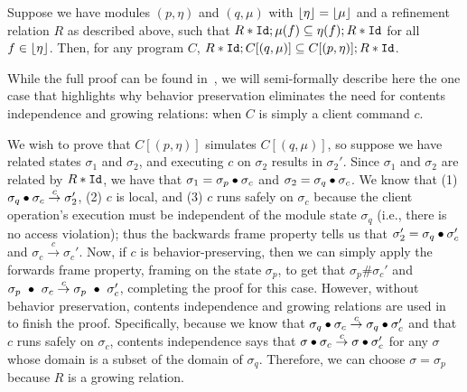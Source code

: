 \begin{thm}
Suppose we have modules $(p,\eta)$ and $(q,\mu)$ with $\lfloor \eta \rfloor = \lfloor \mu \rfloor$ and a refinement relation $R$ as described above, such that 
$R*\text{\tt{Id}};\mu(f) \subseteq \eta(f);R*\text{\tt{Id}}$ for all $f \in \lfloor \eta \rfloor$. Then, for any program $C$, $R*\text{\tt{Id}};C[(q,\mu)] \subseteq C[(p,\eta)];R*\text{\tt{Id}}$.
\end{thm}
\begin{comment}
\ifextended
See the campanion Coq file~\cite{costanzo12:bpsltr} for the full proof of this theorem.  
We will semi-formally describe here the one case 
that highlights why behavior preservation eliminates the need for contents independence and growing 
relations: when $C$ is simply a client command $c$.
\else
\end{comment}
While the full proof can be found in~\cite{costanzo12:bpsltr}, we will semi-formally describe here the one case 
that highlights why behavior preservation eliminates the need for contents independence and growing 
relations: when $C$ is simply a client command $c$. 

We wish to prove
that $C[(p,\eta)]$ simulates $C[(q,\mu)]$, so suppose we have related states $\sigma_1$ and $\sigma_2$, and 
executing $c$ on $\sigma_2$ results in $\sigma_2'$. Since $\sigma_1$ and $\sigma_2$ are related by $R*\text{\tt{Id}}$, we
have that $\sigma_1 = \sigma_p \bullet \sigma_c$ and $\sigma_2 = \sigma_q \bullet \sigma_c$. We know that
(1) $\sigma_q \bullet \sigma_c \stackrel{c}{\to} \sigma_2'$, (2) $c$ is local, and (3) $c$ runs safely on $\sigma_c$ because the
client operation's execution must be independent of the module state $\sigma_q$ (i.e., there
is no access violation); thus the backwards frame property tells us that
$\sigma_2' = \sigma_q \bullet \sigma_c'$ and $\sigma_c \stackrel{c}{\to} \sigma_c'$. Now, if $c$ is behavior-preserving,
then we can simply apply the forwards frame property, framing on the state $\sigma_p$, to get that 
$\sigma_p \# \sigma_c'$ and $\sigma_p~\bullet~\sigma_c \stackrel{c}{\to} \sigma_p~\bullet~\sigma_c'$, completing
the proof for this case. However, without behavior preservation, contents independence and growing relations
are used in~\cite{filipovic10} to finish the proof. Specifically, because we know that 
$\sigma_q \bullet \sigma_c \stackrel{c}{\to} \sigma_q \bullet \sigma_c'$ and that $c$ runs safely on $\sigma_c$,
contents independence says that $\sigma \bullet \sigma_c \stackrel{c}{\to} \sigma \bullet \sigma_c'$ for any
$\sigma$ whose domain is a subset of the domain of $\sigma_q$. Therefore, we can choose $\sigma = \sigma_p$
because $R$ is a growing relation.

